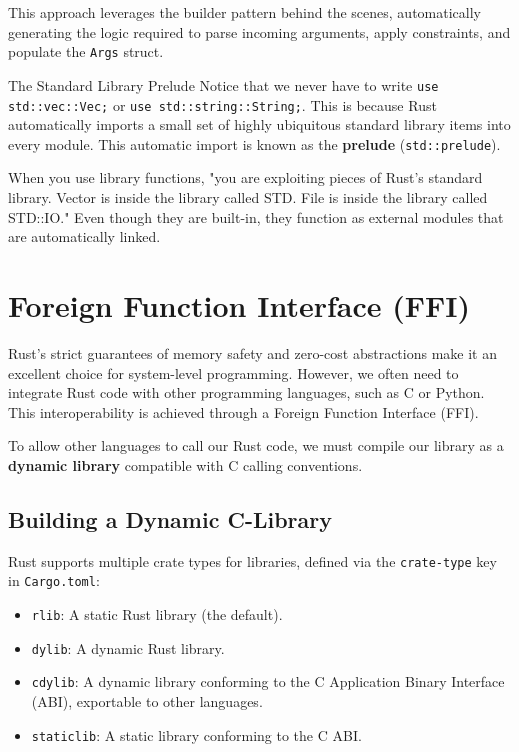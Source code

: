 This approach leverages the builder pattern behind the scenes, automatically generating the logic required to parse incoming arguments, apply constraints, and populate the \texttt{Args} struct.

\begin{exambox}{The Standard Library Prelude}
Notice that we never have to write \texttt{use std::vec::Vec;} or \texttt{use std::string::String;}. This is because Rust automatically imports a small set of highly ubiquitous standard library items into every module. This automatic import is known as the \textbf{prelude} (\texttt{std::prelude}).

When you use library functions, "you are exploiting pieces of Rust's standard library. Vector is inside the library called STD. File is inside the library called STD::IO." Even though they are built-in, they function as external modules that are automatically linked.
\end{exambox}

\section{Foreign Function Interface (FFI)}

Rust's strict guarantees of memory safety and zero-cost abstractions make it an excellent choice for system-level programming. However, we often need to integrate Rust code with other programming languages, such as C or Python. This interoperability is achieved through a Foreign Function Interface (FFI).

To allow other languages to call our Rust code, we must compile our library as a \textbf{dynamic library} compatible with C calling conventions. 

\subsection{Building a Dynamic C-Library}
Rust supports multiple crate types for libraries, defined via the \texttt{crate-type} key in \texttt{Cargo.toml}:
\begin{itemize}
    \item \texttt{rlib}: A static Rust library (the default).
    \item \texttt{dylib}: A dynamic Rust library.
    \item \texttt{cdylib}: A dynamic library conforming to the C Application Binary Interface (ABI), exportable to other languages.
    \item \texttt{staticlib}: A static library conforming to the C ABI.
\end{itemize}


